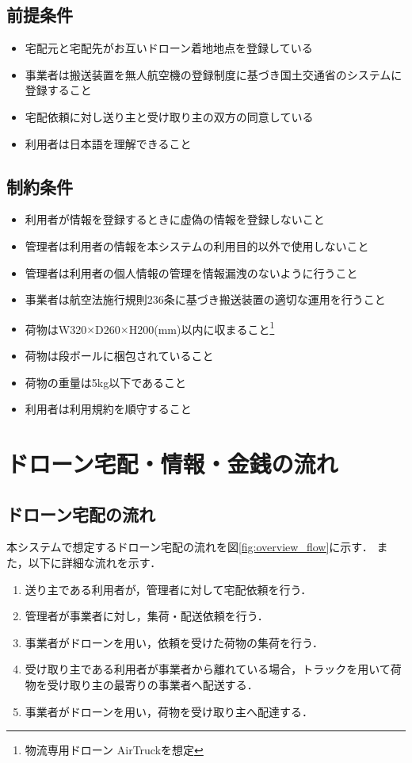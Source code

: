 \documentclass[a4paper, titlepage]{jsarticle}
\begin{document}
\subsection{前提条件}
\begin{itemize}
  \item 宅配元と宅配先がお互いドローン着地地点を登録している
  \item 事業者は搬送装置を無人航空機の登録制度に基づき国土交通省のシステムに登録すること
  \item 宅配依頼に対し送り主と受け取り主の双方の同意している
  \item 利用者は日本語を理解できること
\end{itemize}
\subsection{制約条件}
\begin{itemize}
\item 利用者が情報を登録するときに虚偽の情報を登録しないこと
\item 管理者は利用者の情報を本システムの利用目的以外で使用しないこと
\item 管理者は利用者の個人情報の管理を情報漏洩のないように行うこと
\item 事業者は航空法施行規則236条に基づき搬送装置の適切な運用を行うこと
\item 荷物はW320$\times$D260$\times$H200(mm)以内に収まること\footnote{\label{fot:airtruck}物流専用ドローン AirTruck\cite{aeronext_airtruck}を想定}
\item 荷物は段ボールに梱包されていること
\item 荷物の重量は5kg以下であること
\item 利用者は利用規約を順守すること
\end{itemize}
\section{ドローン宅配・情報・金銭の流れ}

\subsection{ドローン宅配の流れ}
本システムで想定するドローン宅配の流れを図\ref{fig:overview_flow}に示す．
また，以下に詳細な流れを示す．

\begin{enumerate}
\item 送り主である利用者が，管理者に対して宅配依頼を行う．
\item 管理者が事業者に対し，集荷・配送依頼を行う．
\item 事業者がドローンを用い，依頼を受けた荷物の集荷を行う．
\item 受け取り主である利用者が事業者から離れている場合，トラックを用いて荷物を受け取り主の最寄りの事業者へ配送する．
\item 事業者がドローンを用い，荷物を受け取り主へ配達する．
\end{enumerate}
\end{document}
